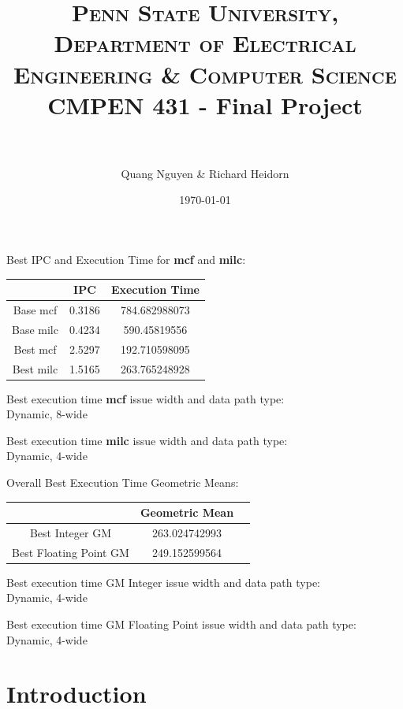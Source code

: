 \documentclass[paper=a4, fontsize=12pt]{scrartcl} %
\title{	
\normalfont \small 
\textsc{Penn State University, Department of Electrical Engineering \& Computer Science}
\horrule{0.5pt} \\[0.4cm] %
	\huge CMPEN 431 - Final Project \\ %
\horrule{2pt} \\[0.5cm] %
}
\author{Quang Nguyen \& Richard Heidorn}
\date{\normalsize \today}
\numberwithin{equation}{section} %
\numberwithin{figure}{section} %
\numberwithin{table}{section} %
\begin{document}
\maketitle %


Best IPC and Execution Time for \textbf{mcf} and \textbf{milc}:

\begin{center}
\begin{tabular}{ |c|c|c| } 
	\hline
	 & IPC & Execution Time \\ \hline
	Base mcf & 0.3186 & 784.682988073 \\ \hline
	Base milc & 0.4234 & 590.45819556 \\ \hline
	Best mcf & 2.5297 & 192.710598095 \\ \hline
	Best milc & 1.5165 & 263.765248928 \\ \hline
\end{tabular}
\end{center}

Best execution time \textbf{mcf} issue width and data path type: \\
Dynamic, 8-wide

Best execution time \textbf{milc} issue width and data path type: \\
Dynamic, 4-wide

Overall Best Execution Time Geometric Means:

\begin{center}
\begin{tabular}{ |c|c|c| } 
	\hline
	 & Geometric Mean \\ \hline
	Best Integer GM & 263.024742993 \\ \hline
	Best Floating Point GM & 249.152599564 \\ \hline
\end{tabular}
\end{center}

Best execution time GM Integer issue width and data path type: \\
Dynamic, 4-wide

Best execution time GM Floating Point issue width and data path type: \\
Dynamic, 4-wide


\newpage


\section{Introduction}
\end{document}

